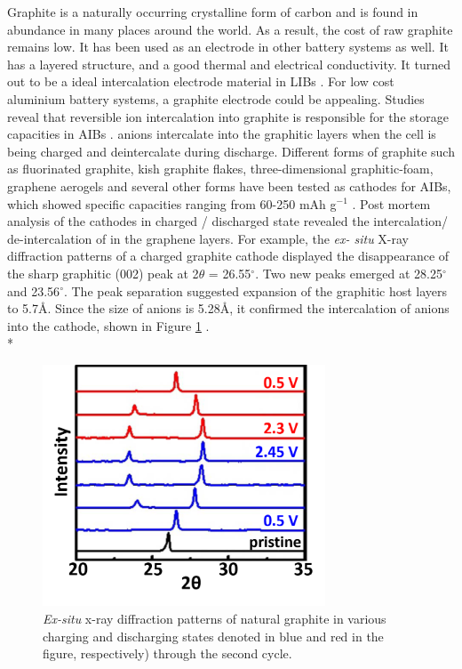 Graphite is a naturally occurring crystalline form of carbon and is found in abundance in many places around the world. As a result, the cost of raw graphite remains low. It has been used as an electrode in other battery systems as well. It has a layered structure, and a good thermal and electrical conductivity. It turned out to be a ideal intercalation electrode material in LIBs \cite{ji_recent_2011, yoo_large_2008, lian_large_2010}. For low cost aluminium battery systems, a graphite electrode could be appealing. Studies reveal that reversible ion intercalation into graphite is responsible for the storage capacities in AIBs \cite{rani_fluorinated_2013, lin_ultrafast_2015}.  anions intercalate into the graphitic layers when the cell is being charged and deintercalate during discharge. Different forms of graphite such as fluorinated graphite, kish graphite flakes, three-dimensional graphitic-foam, graphene aerogels and several other forms have been tested as cathodes for AIBs, which showed specific capacities ranging from 60-250 mAh g$^{-1}$ \cite{rani_fluorinated_2013, wang_kish_2017, wu_3d_2016, huang_graphene_2019}. Post mortem analysis of the cathodes in charged / discharged state revealed the intercalation/ de-intercalation of  in the graphene layers. For example, the \textit{ex- situ} X-ray diffraction patterns of a charged graphite cathode displayed the disappearance of the sharp graphitic (002) peak at 2$\theta$ = 26.55$^{\circ}$. Two new peaks emerged at 28.25$^{\circ}$ and 23.56$^{\circ}$. The peak separation suggested expansion of the graphitic host layers to 5.7\AA. Since the size of  anions is 5.28\AA, it confirmed the intercalation of  anions into the cathode, shown in Figure \ref{Figures/chap5fig:ramanpap} \cite{lin_ultrafast_2015, wang_kish_2017}. \\*

 \begin{figure}[h]
  \centering
  \includegraphics[width=0.75\textwidth]{Figures/chap5fig/ramanpap}
    \caption{\textit{Ex-situ} x-ray diffraction patterns of natural graphite in various charging and discharging states denoted in blue and red in the figure, respectively) through the second cycle. \cite{wang_advanced_2017}}
  \label{Figures/chap5fig:ramanpap}
\end{figure}

